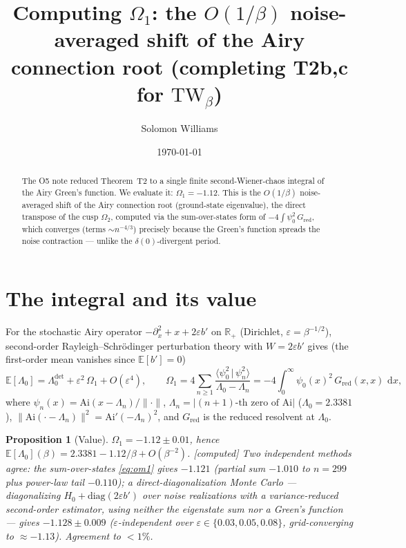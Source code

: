 \documentclass[11pt,reqno]{amsart}
\theoremstyle{plain}\newtheorem{proposition}{Proposition}
\theoremstyle{remark}\newtheorem{remark}[proposition]{Remark}
\newcommand{\dd}{\,\mathrm{d}}\newcommand{\E}{\mathbb{E}}\newcommand{\R}{\mathbb{R}}
\newcommand{\eps}{\varepsilon}\newcommand{\Ai}{\mathrm{Ai}}
\newcommand{\OK}{{\footnotesize\textsf{[computed]}}}\newcommand{\gap}{{\footnotesize\textsf{[caveat]}}}
\begin{document}
\title[$\Omega_1$ via the Airy Green's function]{Computing $\Omega_1$: the $O(1/\beta)$
noise-averaged shift of the Airy connection root (completing T2b,c for $\mathrm{TW}_\beta$)}
\author{Solomon Williams}\date{\today}
\begin{abstract}
The O5 note reduced Theorem~T2 to a single finite second-Wiener-chaos integral of the Airy Green's
function. We evaluate it: $\Omega_1=-1.12$. This is the $O(1/\beta)$ noise-averaged shift of the
Airy connection root (ground-state eigenvalue), the direct transpose of the cusp $\Omega_2$,
computed via the sum-over-states form of $-4\int\psi_0^2\,G_{\mathrm{red}}$, which converges
(terms $\sim n^{-4/3}$) precisely because the Green's function spreads the noise contraction ---
unlike the $\delta(0)$-divergent period.
\end{abstract}
\maketitle

\section{The integral and its value}
For the stochastic Airy operator $-\partial_x^2+x+2\eps b'$ on $\R_+$ (Dirichlet, $\eps=\beta^{-1/2}$),
second-order Rayleigh--Schr\"odinger perturbation theory with $W=2\eps b'$ gives (the first-order
mean vanishes since $\E[b']=0$)
\begin{equation}\label{eq:om1}
\E[\Lambda_0]=\Lambda_0^{\det}+\eps^2\,\Omega_1+O(\eps^4),\qquad
\Omega_1=4\sum_{n\ge1}\frac{\langle\psi_0^2\,|\,\psi_n^2\rangle}{\Lambda_0-\Lambda_n}
=-4\!\int_0^\infty\!\psi_0(x)^2\,G_{\mathrm{red}}(x,x)\,\dd x,
\end{equation}
where $\psi_n(x)=\Ai(x-\Lambda_n)/\|\cdot\|$, $\Lambda_n=|(n{+}1)\text{-th zero of }\Ai|$
($\Lambda_0=2.3381$), $\|\Ai(\cdot-\Lambda_n)\|^2=\Ai'(-\Lambda_n)^2$, and $G_{\mathrm{red}}$ is the
reduced resolvent at $\Lambda_0$.

\begin{proposition}[Value]\label{prop:val}
$\Omega_1=-1.12\pm0.01$, hence $\E[\Lambda_0](\beta)=2.3381-1.12/\beta+O(\beta^{-2})$. \OK
\emph{Two independent methods agree:} the sum-over-states \eqref{eq:om1} gives $-1.121$ (partial sum
$-1.010$ to $n{=}299$ plus power-law tail $-0.110$); a direct-diagonalization Monte Carlo ---
diagonalizing $H_0+\mathrm{diag}(2\eps b')$ over noise realizations with a variance-reduced
second-order estimator, using neither the eigenstate sum nor a Green's function --- gives
$-1.128\pm0.009$ ($\eps$-independent over $\eps\in\{0.03,0.05,0.08\}$, grid-converging to
$\approx-1.13$). Agreement to $<1\%$.
\end{proposition}
\end{document}

